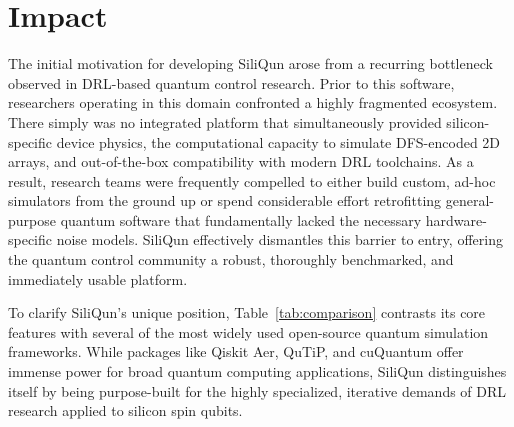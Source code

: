 \documentclass[preprint,12pt, a4paper]{elsarticle}
\begin{document}
\begin{table}[htbp]
\centering
\caption{Computational complexity of the SiliQun SV engine. $n$ denotes the number of encoded qubits. Memory and operation costs refer to the encoded subspace; the full physical space would require $2^{3n}$.}
\label{tab:complexity}
\end{table}

\section{Impact}
\label{sec:impact}

The initial motivation for developing SiliQun arose from a recurring bottleneck observed in DRL-based quantum control research. Prior to this software, researchers operating in this domain confronted a highly fragmented ecosystem. There simply was no integrated platform that simultaneously provided silicon-specific device physics, the computational capacity to simulate DFS-encoded 2D arrays, and out-of-the-box compatibility with modern DRL toolchains. As a result, research teams were frequently compelled to either build custom, ad-hoc simulators from the ground up or spend considerable effort retrofitting general-purpose quantum software that fundamentally lacked the necessary hardware-specific noise models. SiliQun effectively dismantles this barrier to entry, offering the quantum control community a robust, thoroughly benchmarked, and immediately usable platform.

To clarify SiliQun's unique position, Table~\ref{tab:comparison} contrasts its core features with several of the most widely used open-source quantum simulation frameworks. While packages like Qiskit Aer, QuTiP, and cuQuantum offer immense power for broad quantum computing applications, SiliQun distinguishes itself by being purpose-built for the highly specialized, iterative demands of DRL research applied to silicon spin qubits.
\end{document}
